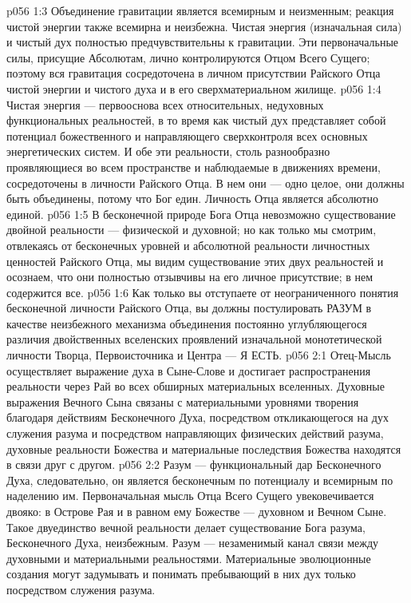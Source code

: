 \vs p056 1:3 Объединение гравитации является всемирным и неизменным; реакция чистой энергии также всемирна и неизбежна. Чистая энергия (изначальная сила) и чистый дух полностью предчувствительны к гравитации. Эти первоначальные силы, присущие Абсолютам, лично контролируются Отцом Всего Сущего; поэтому вся гравитация сосредоточена в личном присутствии Райского Отца чистой энергии и чистого духа и в его сверхматериальном жилище.
\vs p056 1:4 \pc Чистая энергия --- первооснова всех относительных, недуховных функциональных реальностей, в то время как чистый дух представляет собой потенциал божественного и направляющего сверхконтроля всех основных энергетических систем. И обе эти реальности, столь разнообразно проявляющиеся во всем пространстве и наблюдаемые в движениях времени, сосредоточены в личности Райского Отца. В нем они --- одно целое, они должны быть объединены, потому что Бог един. Личность Отца является абсолютно единой.
\vs p056 1:5 В бесконечной природе Бога Отца невозможно существование двойной реальности --- физической и духовной; но как только мы смотрим, отвлекаясь от бесконечных уровней и абсолютной реальности личностных ценностей Райского Отца, мы видим существование этих двух реальностей и осознаем, что они полностью отзывчивы на его личное присутствие; в нем содержится все.
\vs p056 1:6 Как только вы отступаете от неограниченного понятия бесконечной личности Райского Отца, вы должны постулировать РАЗУМ в качестве неизбежного механизма объединения постоянно углубляющегося различия двойственных вселенских проявлений изначальной монотетической личности Творца, Первоисточника и Центра --- Я ЕСТЬ.
\vs p056 2:1 Отец\hyp{}Мысль осуществляет выражение духа в Сыне\hyp{}Слове и достигает распространения реальности через Рай во всех обширных материальных вселенных. Духовные выражения Вечного Сына связаны с материальными уровнями творения благодаря действиям Бесконечного Духа, посредством откликающегося на дух служения разума и посредством направляющих физических действий разума, духовные реальности Божества и материальные последствия Божества находятся в связи друг с другом.
\vs p056 2:2 Разум --- функциональный дар Бесконечного Духа, следовательно, он является бесконечным по потенциалу и всемирным по наделению им. Первоначальная мысль Отца Всего Сущего увековечивается двояко: в Острове Рая и в равном ему Божестве --- духовном и Вечном Сыне. Такое двуединство вечной реальности делает существование Бога разума, Бесконечного Духа, неизбежным. Разум --- незаменимый канал связи между духовными и материальными реальностями. Материальные эволюционные создания могут задумывать и понимать пребывающий в них дух только посредством служения разума.
